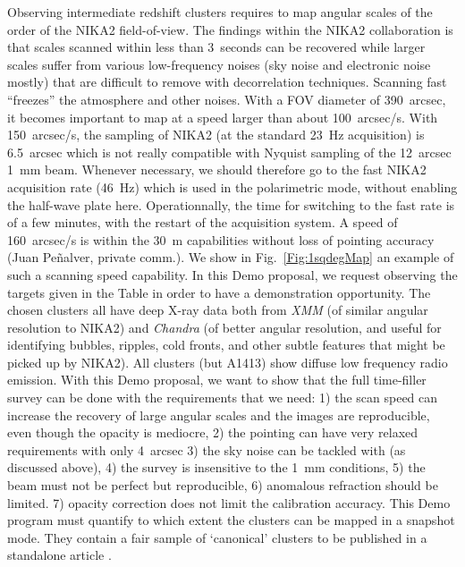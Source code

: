 \documentclass[10pt,a4paper,twoside,graphicx,color]{article}
\begin{document}
\vspace{-0.1cm}  Observing intermediate redshift clusters requires to map
angular scales of the order of the NIKA2 field-of-view. The findings
within the NIKA2 collaboration is that scales scanned within less than
3~seconds can be recovered while larger scales suffer from various
low-frequency noises (sky noise and electronic noise mostly) that are
difficult to remove with decorrelation techniques. Scanning fast
``freezes'' the atmosphere and other noises. With a FOV diameter of
390~arcsec, it becomes important to map at a speed larger than about
100~arcsec/s. With 150~arcsec/s, the sampling of NIKA2 (at the
standard 23~Hz acquisition) is 6.5~arcsec which is not really
compatible with Nyquist sampling of the 12~arcsec 1~mm beam. Whenever
necessary, we should therefore go to the fast NIKA2 acquisition rate
(46~Hz) which is used in the polarimetric mode, without enabling the
half-wave plate here. Operationnally, the time for switching to the
fast rate is of a few minutes, with the restart of the acquisition
system. A speed of 160~arcsec/s is within the 30~m capabilities
without loss of pointing accuracy (Juan Peñalver, private comm.). We
show in Fig.~\ref{Fig:1sqdegMap} an example of such a scanning speed
capability. In this Demo proposal, we request observing the targets
given in the Table in order to have a demonstration opportunity. The
chosen clusters all have deep X-ray data both from {\sl XMM} (of
similar angular resolution to NIKA2) and {\sl Chandra} (of better
angular resolution, and useful for identifying bubbles, ripples, cold
fronts, and other subtle features that might be picked up by
NIKA2). All clusters (but A1413) show diffuse low frequency radio
emission. With this Demo proposal, we want to show that the full
time-filler survey can be done with the requirements that we need: 1)
the scan speed can increase the recovery of large angular scales and
the images are reproducible, even though the opacity is mediocre, 2)
the pointing can have very relaxed requirements with only 4~arcsec 3)
the sky noise can be tackled with (as discussed above), 4) the survey
is insensitive to the 1~mm conditions, 5) the beam must not be perfect
but reproducible, 6) anomalous refraction should be limited. 7)
opacity correction does not limit the calibration accuracy. This Demo
program must quantify to which extent the clusters can be mapped in a
snapshot mode. They contain a fair sample of `canonical' clusters to
be published in a standalone article .
\end{document}
